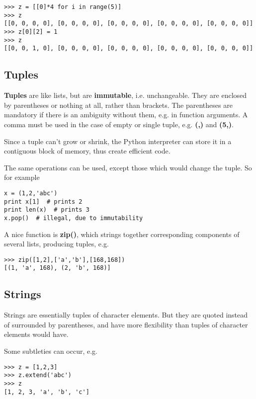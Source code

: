 \begin{Verbatim}[fontsize=\relsize{-2}]
>>> z = [[0]*4 for i in range(5)]
>>> z
[[0, 0, 0, 0], [0, 0, 0, 0], [0, 0, 0, 0], [0, 0, 0, 0], [0, 0, 0, 0]]
>>> z[0][2] = 1
>>> z
[[0, 0, 1, 0], [0, 0, 0, 0], [0, 0, 0, 0], [0, 0, 0, 0], [0, 0, 0, 0]]
\end{Verbatim}

\subsection{Tuples}

{\bf Tuples} are like lists, but are {\bf immutable}, i.e. unchangeable.
They are enclosed by parentheses or nothing at all, rather than
brackets.  The parentheses are mandatory if there is an ambiguity
without them, e.g. in function arguments.  A comma must be used in the
case of empty or single tuple, e.g. {\bf (,)} and {\bf (5,)}.

Since a tuple can't grow or shrink, the Python interpreter can store it
in a contiguous block of memory, thus create efficient code.

The same operations can be used, except those which would change the tuple.
So for example 

\begin{Verbatim}[fontsize=\relsize{-2}]
x = (1,2,'abc') 
print x[1]  # prints 2
print len(x)  # prints 3
x.pop()  # illegal, due to immutability
\end{Verbatim}

A nice function is {\bf zip()}, which strings together corresponding
components of several lists, producing tuples, e.g.

\begin{Verbatim}[fontsize=\relsize{-2}]
>>> zip([1,2],['a','b'],[168,168])  
[(1, 'a', 168), (2, 'b', 168)]
\end{Verbatim}

\subsection{Strings}
\label{stringsec}

Strings are essentially tuples of character elements.  But they are
quoted instead of surrounded by parentheses, and have more flexibility
than tuples of character elements would have.  

Some subtleties can occur, e.g.

\begin{lstlisting}
>>> z = [1,2,3]
>>> z.extend('abc')
>>> z
[1, 2, 3, 'a', 'b', 'c']
\end{lstlisting}

